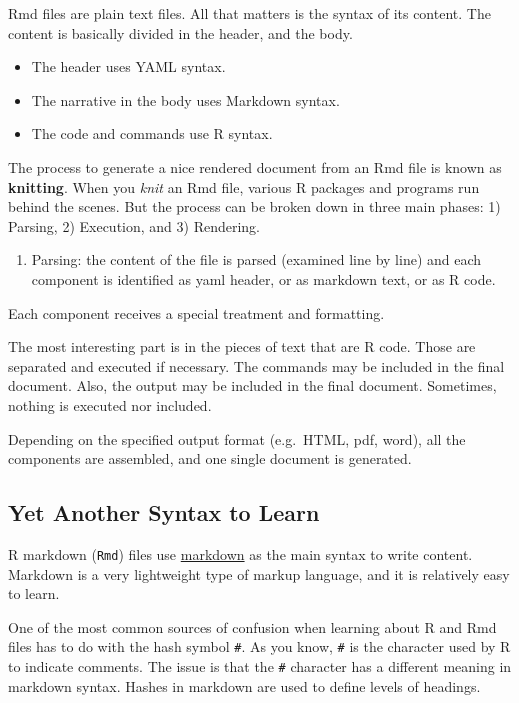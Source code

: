 \documentclass[
]{book}
\providecommand{\tightlist}{%
  \setlength{\itemsep}{0pt}\setlength{\parskip}{0pt}}
\begin{document}
Rmd files are plain text files. All that matters is the syntax of its content.
The content is basically divided in the header, and the body.

\begin{itemize}
\tightlist
\item
  The header uses YAML syntax.
\item
  The narrative in the body uses Markdown syntax.
\item
  The code and commands use R syntax.
\end{itemize}

The process to generate a nice rendered document from an Rmd file is
known as \textbf{knitting}. When you \emph{knit} an Rmd file, various R packages
and programs run behind the scenes. But the process can be broken down
in three main phases: 1) Parsing, 2) Execution, and 3) Rendering.

\begin{enumerate}
\def\labelenumi{\arabic{enumi})}
\tightlist
\item
  Parsing: the content of the file is parsed (examined line by line)
  and each component is identified as yaml header, or as markdown text, or as R code.
\end{enumerate}

Each component receives a special treatment and formatting.

The most interesting part is in the pieces of text that are R code.
Those are separated and executed if necessary. The commands may be included
in the final document. Also, the output may be included in the final document.
Sometimes, nothing is executed nor included.

Depending on the specified output format (e.g.~HTML, pdf, word), all the
components are assembled, and one single document is generated.

\hypertarget{yet-another-syntax-to-learn}{%
\subsection{Yet Another Syntax to Learn}\label{yet-another-syntax-to-learn}}

R markdown (\texttt{Rmd}) files use \href{https://daringfireball.net/projects/markdown/}{markdown}
as the main syntax to write content. Markdown is a very lightweight type of
markup language, and it is relatively easy to learn.

One of the most common sources of confusion when learning about R and Rmd
files has to do with the hash symbol \texttt{\#}. As you know, \texttt{\#} is the character
used by R to indicate comments. The issue is that the \texttt{\#} character has a
different meaning in markdown syntax. Hashes in markdown are used to define
levels of headings.
\end{document}
